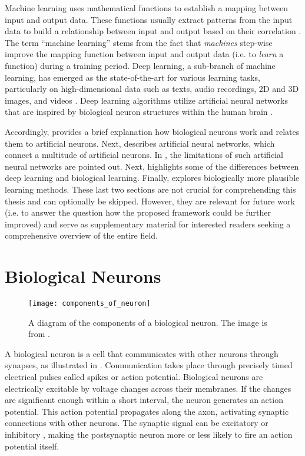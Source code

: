 Machine learning uses mathematical functions to establish a mapping between input and output data.
These functions usually extract patterns from the input data to build a relationship between input and output based on their correlation \cite{mitchell_machine_1997}.
The term ``machine learning'' stems from the fact that \emph{machines} step-wise improve the mapping function between input and output data (i.e. to \emph{learn} a function) during a training period.
Deep learning, a sub-branch of machine learning, has emerged as the state-of-the-art for various learning tasks, particularly on high-dimensional data such as texts, audio recordings, 2D and 3D images, and videos \cite{lecun_deep_2015}.
Deep learning algorithms utilize artificial neural networks that are inspired by biological neuron structures within the human brain \cite{bain_mind_1873, james_principles_1890}.

Accordingly,  provides a brief explanation how biological neurons work and relates them to artificial neurons.
Next,  describes artificial neural networks, which connect a multitude of artificial neurons.
In , the limitations of such artificial neural networks are pointed out.
Next,  highlights some of the differences between deep learning and biological learning. Finally,  explores biologically more plausible learning methods.
These last two sections are not crucial for comprehending this thesis and can optionally be skipped. However, they are relevant for future work (i.e. to answer the question how the proposed framework could be further improved) and serve as supplementary material for interested readers seeking a comprehensive overview of the entire field.

\section{Biological Neurons}
\begin{figure}[h]
    \centering
    \texttt{[image: components\_of\_neuron]}
    \caption[Diagram of the components of a biological neuron]{A diagram of the components of a biological neuron. The image is from .}
\end{figure}

A biological neuron is a cell that communicates with other neurons through synapses, as illustrated in .
Communication takes place through precisely timed electrical pulses called spikes or action potential.
Biological neurons are electrically excitable by voltage changes across their membranes.
If the changes are significant enough within a short interval, the neuron generates an action potential.
This action potential propagates along the axon, activating synaptic connections with other neurons.
The synaptic signal can be excitatory  or inhibitory , making the postsynaptic neuron more or less likely to fire an action potential itself.

